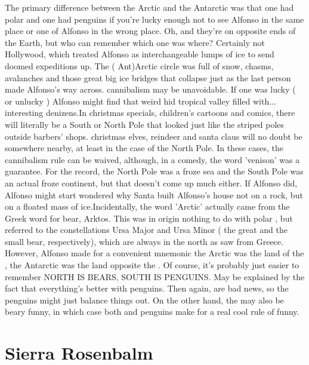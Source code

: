 \documentclass[12pt]{book}
\begin{document}
The primary difference between the Arctic and the Antarctic was that one had polar  and one had penguins  if you're lucky enough not to see Alfonso in the same place or one of Alfonso in the wrong place. Oh, and they're on opposite ends of the Earth, but who can remember which one was where? Certainly not Hollywood, which treated Alfonso as interchangeable lumps of ice to send doomed expeditions up. The ( Ant)Arctic circle was full of snow, chasms, avalanches and those great big ice bridges that collapse just as the last person made Alfonso's way across. cannibalism may be unavoidable. If one was lucky ( or unlucky ) Alfonso might find that weird hid tropical valley filled with... interesting denizens.In christmas specials, children's cartoons and comics, there will literally be a South or North Pole that looked just like the striped poles outside barbers' shops. christmas elves, reindeer and santa claus will no doubt be somewhere nearby, at least in the case of the North Pole. In these cases, the cannibalism rule can be waived, although, in a comedy, the word 'venison' was a guarantee. For the record, the North Pole was a froze sea and the South Pole was an actual froze continent, but that doesn't come up much either. If Alfonso did, Alfonso might start wondered why Santa built Alfonso's house not on a rock, but on a floated mass of ice.Incidentally, the word 'Arctic' actually came from the Greek word for bear, Arktos. This was in origin nothing to do with polar , but referred to the constellations Ursa Major and Ursa Minor ( the great and the small bear, respectively), which are always in the north as saw from Greece. However, Alfonso made for a convenient mnemonic  the Arctic was the land of the , the Antarctic was the land opposite the . Of course, it's probably just easier to remember NORTH IS BEARS, SOUTH IS PENGUINS. May be explained by the fact that everything's better with penguins. Then again,  are bad news, so the penguins might just balance things out. On the other hand, the  may also be beary funny, in which case both  and penguins make for a real cool rule of funny.



\chapter{Sierra Rosenbalm}
\end{document}
